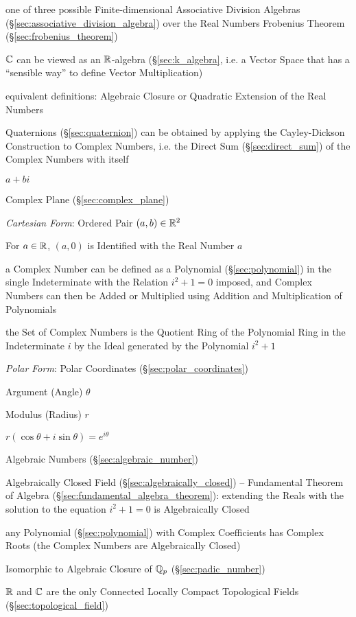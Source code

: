 one of three possible Finite-dimensional Associative Division Algebras
(\S\ref{sec:associative_division_algebra}) over the Real Numbers \fist
Frobenius Theorem (\S\ref{sec:frobenius_theorem})

$\mathbb{C}$ can be viewed as an $\mathbb{R}$-algebra (\S\ref{sec:k_algebra}, i.e. a
Vector Space that has a ``sensible way'' to define Vector Multiplication)

equivalent definitions: Algebraic Closure or Quadratic Extension of
the Real Numbers

Quaternions (\S\ref{sec:quaternion}) can be obtained by applying the
Cayley-Dickson Construction to Complex Numbers, i.e. the Direct Sum
(\S\ref{sec:direct_sum}) of the Complex Numbers with itself

$a + bi$

Complex Plane (\S\ref{sec:complex_plane})

\emph{Cartesian Form}: Ordered Pair $(a,b) \in \mathbb{R}^2$

For $a \in \mathbb{R}$, $(a,0)$ is Identified with the Real Number $a$

a Complex Number can be defined as a Polynomial (\S\ref{sec:polynomial}) in the
single Indeterminate with the Relation $i^2 + 1 = 0$ imposed, and Complex
Numbers can then be Added or Multiplied using Addition and Multiplication of
Polynomials

the Set of Complex Numbers is the Quotient Ring of the Polynomial Ring in the
Indeterminate $i$ by the Ideal generated by the Polynomial $i^2 + 1$

\emph{Polar Form}: Polar Coordinates (\S\ref{sec:polar_coordinates})

Argument (Angle) $\theta$

Modulus (Radius) $r$

$r(\cos\theta + i \sin\theta) = e^{i\theta}$

Algebraic Numbers (\S\ref{sec:algebraic_number})

Algebraically Closed Field (\S\ref{sec:algebraically_closed}) -- Fundamental
Theorem of Algebra (\S\ref{sec:fundamental_algebra_theorem}): extending the
Reals with the solution to the equation $i^2 + 1 = 0$ is Algebraically Closed

any Polynomial (\S\ref{sec:polynomial}) with Complex Coefficients has Complex
Roots (the Complex Numbers are Algebraically Closed)

Isomorphic to Algebraic Closure of $\mathbb{Q}_p$ (\S\ref{sec:padic_number})

$\mathbb{R}$ and $\mathbb{C}$ are the only Connected Locally Compact
Topological Fields (\S\ref{sec:topological_field})

